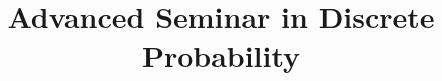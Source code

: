 \documentclass[oneside,american]{amsart}
\numberwithin{equation}{section}
\numberwithin{figure}{section}
\theoremstyle{plain}
\theoremstyle{definition}
\theoremstyle{plain}
\theoremstyle{plain}
\begin{document}
\title{Advanced Seminar in Discrete Probability}


\date{}

\maketitle
\tableofcontents{}


\end{document}
